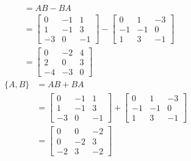 \begin{align}
	[A,B]
&=
	AB
	-
	BA \\
%
%
&=
	\left[
	\begin{array}{ccc}
		 0 & -1 &  1 \\
		 1 & -1 &  3 \\
		-3 &  0 & -1
	\end{array}
	\right]
	-
	\left[
	\begin{array}{ccc}
		 0 &  1 & -3 \\
		-1 & -1 &  0 \\
		 1 &  3 & -1
	\end{array}
	\right] \\
%
%
&=
	\left[
	\begin{array}{ccc}
		 0 & -2 &  4 \\
		 2 &  0 &  3 \\
		-4 & -3 &  0
	\end{array}
	\right]
\end{align}
\begin{align}
	\{A,B\}
&=
	AB
	+
	BA \\
%
%
&=
	\left[
	\begin{array}{ccc}
		 0 & -1 &  1 \\
		 1 & -1 &  3 \\
		-3 &  0 & -1
	\end{array}
	\right]
	+
	\left[
	\begin{array}{ccc}
		 0 &  1 & -3 \\
		-1 & -1 &  0 \\
		 1 &  3 & -1
	\end{array}
	\right] \\
%
%
&=
	\left[
	\begin{array}{ccc}
		 0 &  0 & -2 \\
		 0 & -2 &  3 \\
		-2 &  3 & -2
	\end{array}
	\right]
\end{align}